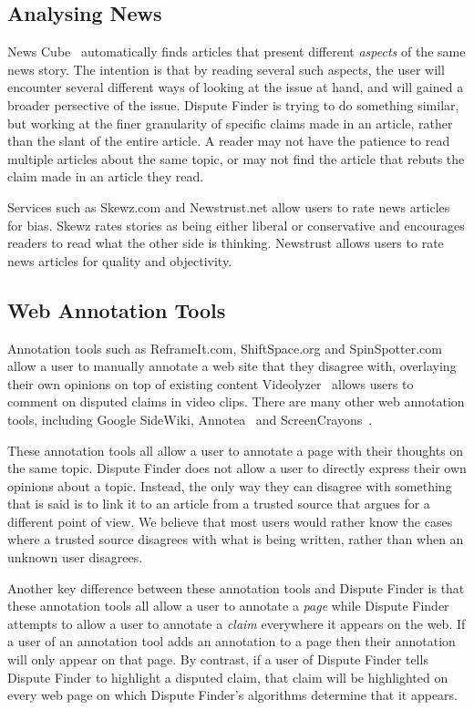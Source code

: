 \documentclass{www2010-submission}
\begin{document}
\subsection{Analysing News}

News Cube~\cite{Park2009} automatically finds articles that present different {\it aspects} of the same news story. The intention is that by reading several such aspects, the user will encounter several different ways of looking at the issue at hand, and will gained a broader persective of the issue. Dispute Finder is trying to do something similar, but working at the finer granularity of specific claims made in an article, rather than the slant of the entire article. A reader may not have the patience to read multiple articles about the same topic, or may not find the article that rebuts the claim made in an article they read. 

Services such as Skewz.com and Newstrust.net allow users to rate news articles for bias. Skewz rates stories as being either liberal or conservative and encourages readers to read what the other side is thinking. Newstrust allows users to rate news articles for quality and objectivity. 


\subsection{Web Annotation Tools}

Annotation tools such as ReframeIt.com, ShiftSpace.org and SpinSpotter.com allow a user to manually annotate a web site that they disagree with, overlaying their own opinions on top of existing content Videolyzer~\cite{Diakopoulos2008} allows users to comment on disputed claims in video clips. There are many other web annotation tools, including Google SideWiki, Annotea~\cite{Koivunen2001} and ScreenCrayons~\cite{Olsen2004}. 

These annotation tools all allow a user to annotate a page with their thoughts on the same topic. Dispute Finder does not allow a user to directly express their own opinions about a topic. Instead, the only way they can disagree with something that is said is to link it to an article from a trusted source that argues for a different point of view. We believe that most users would rather know the cases where a trusted source disagrees with what is being written, rather than when an unknown user disagrees.

Another key difference between these annotation tools and Dispute Finder is that these annotation tools all allow a user to annotate a {\it page} while Dispute Finder attempts to allow a user to annotate a {\it claim} everywhere it appears on the web. If a user of an annotation tool adds an annotation to a page then their annotation will only appear on that page. By contrast, if a user of Dispute Finder tells Dispute Finder to highlight a disputed claim, that claim will be highlighted on every web page on which Dispute Finder's algorithms determine that it appears.
\end{document}
